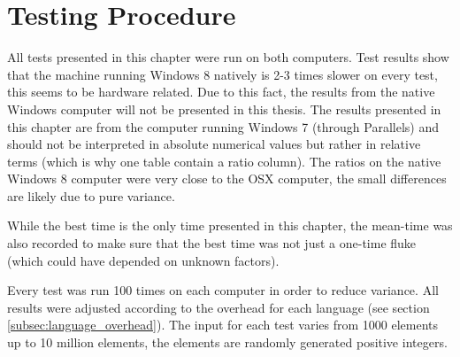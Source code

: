 \section{Testing Procedure}
All tests presented in this chapter were run on both computers. Test results show that the machine running Windows 8 natively is 2-3 times slower on every test, this seems to be hardware related. Due to this fact, the results from the native Windows computer will not be presented in this thesis. The results presented in this chapter are from the computer running Windows 7 (through Parallels) and should not be interpreted in absolute numerical values but rather in relative terms (which is why one table contain a ratio column). The ratios on the native Windows 8 computer were very close to the OSX computer, the small differences are likely due to pure variance.

While the best time is the only time presented in this chapter, the mean-time was also recorded to make sure that the best time was not just a one-time fluke (which could have depended on unknown factors). 

Every test was run 100 times on each computer in order to reduce variance. All results were adjusted according to the overhead for each language (see section \ref{subsec:language_overhead}). The input for each test varies from 1000 elements up to 10 million elements, the elements are randomly generated positive integers. 